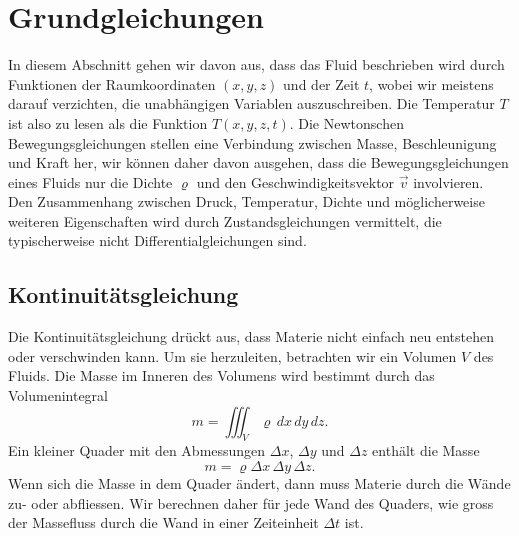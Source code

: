 %
%
%
\section{Grundgleichungen}
%
%
%
In diesem Abschnitt gehen wir davon aus, dass das Fluid beschrieben wird
durch Funktionen der Raumkoordinaten $(x,y,z)$ und der Zeit $t$,
wobei wir meistens darauf verzichten, die unabhängigen Variablen
auszuschreiben.
Die Temperatur $T$ ist also zu lesen als die Funktion $T(x,y,z,t)$.
Die Newtonschen Bewegungsgleichungen stellen eine Verbindung zwischen
Masse, Beschleunigung und Kraft her, wir können daher davon ausgehen,
dass die Bewegungsgleichungen eines Fluids nur die Dichte $\varrho$ und 
den Geschwindigkeitsvektor $\vec{v}$ involvieren.
Den Zusammenhang zwischen Druck, Temperatur, Dichte und möglicherweise
weiteren Eigenschaften wird durch Zustandsgleichungen vermittelt, die
typischerweise nicht Differentialgleichungen sind.

\subsection{Kontinuitätsgleichung}
Die Kontinuitätsgleichung drückt aus, dass
Materie nicht einfach neu entstehen oder verschwinden kann.
Um sie herzuleiten, betrachten wir ein Volumen $V$ des Fluids.
Die Masse im Inneren des Volumens wird bestimmt durch das Volumenintegral
\[
m
=
\iiint_V \varrho \,dx\,dy\,dz.
\]
Ein kleiner Quader mit den Abmessungen $\Delta x$, $\Delta y$
und $\Delta z$ enthält die Masse 
\[
m = \varrho \Delta x \,\Delta y \, \Delta z.
\]
Wenn sich die Masse in dem Quader ändert, dann muss Materie durch die
Wände zu- oder abfliessen.
Wir berechnen daher für jede Wand des Quaders, wie gross der Massefluss
durch die Wand in einer Zeiteinheit $\Delta t$ ist.

